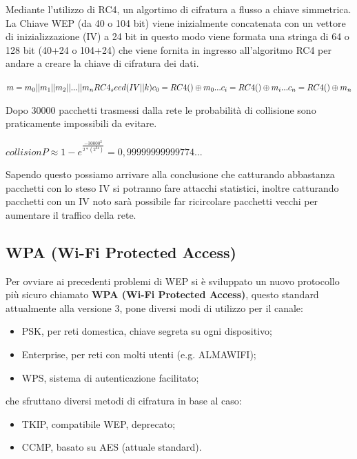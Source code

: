 Mediante l'utilizzo di RC4, un algortimo di cifratura a flusso a chiave simmetrica. La Chiave WEP (da 40 o 104 bit) viene inizialmente concatenata con un vettore di inizializzazione (IV) a 24 bit in questo modo viene formata una stringa di 64 o 128 bit (40+24 o 104+24) che viene fornita in ingresso all’algoritmo RC4 per andare a creare la chiave di cifratura dei dati.

$
    m = m_0||m_1||m_2||...||m_n\\
    RC4_seed(IV||k)\\
    c_0 = RC4() \oplus m_0\\
    ...\\
    c_i = RC4() \oplus m_i\\
    ...\\
    c_n = RC4() \oplus m_n
$

Dopo 30000 pacchetti trasmessi dalla rete le probabilità di collisione sono praticamente impossibili da evitare.

$collisionP \approx 1 - e^\frac{-30000^2}{2*(2^{24})} = 0,99999999999774...$

Sapendo questo possiamo arrivare alla conclusione che catturando abbastanza pacchetti con lo steso IV si potranno fare attacchi statistici, inoltre catturando pacchetti con un IV noto sarà possibile far ricircolare pacchetti vecchi per aumentare il traffico della rete.

\subsection{WPA (Wi-Fi Protected Access)}
Per ovviare ai precedenti problemi di WEP si è sviluppato un nuovo protocollo più sicuro chiamato \textbf{WPA (Wi-Fi Protected Access)}, questo standard attualmente alla versione 3, pone diversi modi di utilizzo per il canale:
\begin{itemize}
    \item PSK, per reti domestica, chiave segreta su ogni dispositivo;
    \item Enterprise, per reti con molti utenti (e.g. ALMAWIFI);
    \item WPS, sistema di autenticazione facilitato;
\end{itemize}
che sfruttano diversi metodi di cifratura in base al caso:
\begin{itemize}
    \item TKIP, compatibile WEP, deprecato;
    \item CCMP, basato su AES (attuale standard).
\end{itemize}

